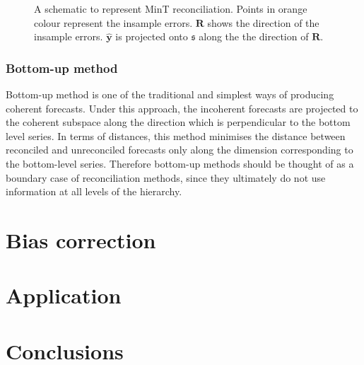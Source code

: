 \documentclass[12pt]{article}
\theoremstyle{definition}
\begin{document}
	 	
	 \begin{figure}[H]
	 		\centering
	 		\small
	 		\resizebox{\linewidth}{!}{
	 			
	 		}
	 		\caption{A schematic to represent MinT reconciliation. Points in orange colour represent the insample errors. $\bm{R}$ shows the direction of the insample errors. $\hat{\bm{y}}$ is projected onto $\mathfrak{s}$ along the the direction of $\bm{R}$.}\label{fig:MinT_justification}
	 \end{figure}
	
	\subsubsection{Bottom-up method}
	
	Bottom-up method is one of the traditional and simplest ways of producing coherent forecasts. Under this approach, the incoherent forecasts are projected to the coherent subspace along the direction which is perpendicular to the bottom level series. In terms of distances, this method minimises the distance between reconciled and unreconciled forecasts only along the dimension corresponding to the bottom-level series. Therefore bottom-up methods should be thought of as a boundary case of reconciliation methods, since they ultimately do not use information at all levels of the hierarchy.   
	
	
	\section{Bias correction}
	
	\section{Application}
	
	\section{Conclusions}
	
	\newpage
	
	
	
	
	
\end{document}
